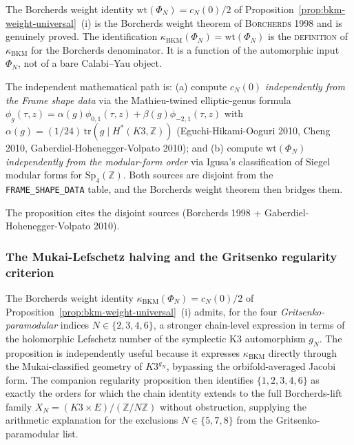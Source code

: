 \begin{remark}
\label{rem:bkm-weight-universal-proof-source}
The Borcherds weight identity
$\mathrm{wt}(\Phi_N) = c_N(0)/2$
of Proposition~\ref{prop:bkm-weight-universal}~(i) is the Borcherds weight
theorem of \textsc{Borcherds 1998} and is genuinely proved. The identification
$\kappa_{\mathrm{BKM}}(\Phi_N) = \mathrm{wt}(\Phi_N)$ is the
\textsc{definition} of $\kappa_{\mathrm{BKM}}$ for the Borcherds denominator.
It is a function of the automorphic input \(\Phi_N\), not of a bare
Calabi--Yau object.

The independent mathematical path is: \textup{(}a\textup{)} compute
$c_N(0)$ \emph{independently from the Frame shape data} via the
Mathieu-twined elliptic-genus formula
$\phi_g(\tau, z) = \alpha(g) \phi_{0,1}(\tau, z) + \beta(g) \phi_{-2,1}(\tau, z)$
with $\alpha(g) = (1/24)\,\mathrm{tr}(g \mid H^*(K3, \mathbb{Z}))$
\textup{(}Eguchi-Hikami-Ooguri 2010, Cheng 2010, Gaberdiel-Hohenegger-Volpato
2010\textup{);} and \textup{(}b\textup{)} compute $\mathrm{wt}(\Phi_N)$
\emph{independently from the modular-form order} via Igusa's classification
of Siegel modular forms for $\mathrm{Sp}_4(\mathbb{Z})$. Both sources are
disjoint from the \texttt{FRAME\_SHAPE\_DATA} table, and the Borcherds
weight theorem then bridges them.

The proposition cites the disjoint sources
\textup{(}Borcherds 1998 + Gaberdiel-Hohenegger-Volpato 2010\textup{).}
\end{remark}

\subsubsection*{The Mukai-Lefschetz halving and the Gritsenko regularity criterion}

The Borcherds weight identity $\kappa_{\mathrm{BKM}}(\Phi_N) = c_N(0)/2$
of Proposition~\ref{prop:bkm-weight-universal}~(i) admits, for the four
\emph{Gritsenko-paramodular} indices $N \in \{2, 3, 4, 6\}$, a stronger
chain-level expression in terms of the holomorphic Lefschetz number of
the symplectic K3 automorphism $g_N$. The proposition is independently
useful because it expresses $\kappa_{\mathrm{BKM}}$ directly through the
Mukai-classified geometry of $K3^{g_N}$, bypassing the orbifold-averaged
Jacobi form. The companion regularity proposition then identifies
$\{1, 2, 3, 4, 6\}$ as exactly the orders for which the chain identity
extends to the full Borcherds-lift family $X_N = (K3 \times E)/(\mathbb{Z}/N\mathbb{Z})$
without obstruction, supplying the arithmetic explanation for the
exclusions $N \in \{5, 7, 8\}$ from the Gritsenko-paramodular list.

